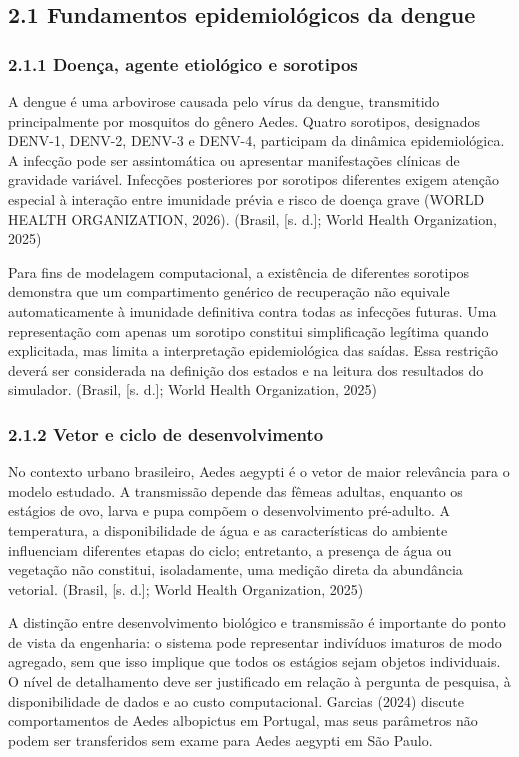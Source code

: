 \subsection{2.1 Fundamentos epidemiológicos da
dengue}\label{fundamentos-epidemioluxf3gicos-da-dengue}

\subsubsection{2.1.1 Doença, agente etiológico e
sorotipos}\label{doenuxe7a-agente-etioluxf3gico-e-sorotipos}

A dengue é uma arbovirose causada pelo vírus da dengue, transmitido
principalmente por mosquitos do gênero Aedes. Quatro sorotipos,
designados DENV-1, DENV-2, DENV-3 e DENV-4, participam da dinâmica
epidemiológica. A infecção pode ser assintomática ou apresentar
manifestações clínicas de gravidade variável. Infecções posteriores por
sorotipos diferentes exigem atenção especial à interação entre imunidade
prévia e risco de doença grave (WORLD HEALTH ORGANIZATION, 2026).
(Brasil, {[}s. d.{]}; World Health Organization, 2025)

Para fins de modelagem computacional, a existência de diferentes
sorotipos demonstra que um compartimento genérico de recuperação não
equivale automaticamente à imunidade definitiva contra todas as
infecções futuras. Uma representação com apenas um sorotipo constitui
simplificação legítima quando explicitada, mas limita a interpretação
epidemiológica das saídas. Essa restrição deverá ser considerada na
definição dos estados e na leitura dos resultados do simulador. (Brasil,
{[}s. d.{]}; World Health Organization, 2025)

\subsubsection{2.1.2 Vetor e ciclo de
desenvolvimento}\label{vetor-e-ciclo-de-desenvolvimento}

No contexto urbano brasileiro, Aedes aegypti é o vetor de maior
relevância para o modelo estudado. A transmissão depende das fêmeas
adultas, enquanto os estágios de ovo, larva e pupa compõem o
desenvolvimento pré-adulto. A temperatura, a disponibilidade de água e
as características do ambiente influenciam diferentes etapas do ciclo;
entretanto, a presença de água ou vegetação não constitui, isoladamente,
uma medição direta da abundância vetorial. (Brasil, {[}s. d.{]}; World
Health Organization, 2025)

A distinção entre desenvolvimento biológico e transmissão é importante
do ponto de vista da engenharia: o sistema pode representar indivíduos
imaturos de modo agregado, sem que isso implique que todos os estágios
sejam objetos individuais. O nível de detalhamento deve ser justificado
em relação à pergunta de pesquisa, à disponibilidade de dados e ao custo
computacional. Garcias (2024) discute comportamentos de Aedes albopictus
em Portugal, mas seus parâmetros não podem ser transferidos sem exame
para Aedes aegypti em São Paulo.

